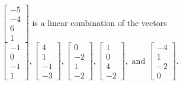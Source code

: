 \begin{exercise}
\begin{exerciseStatement}
  \end{exerciseStatement}
  \begin{exerciseAnswer}
   \(\left[\begin{array}{c}
-5 \\
-4 \\
6 \\
1
\end{array}\right]\) 
  	 is  
	a linear combination of the vectors \(\left[\begin{array}{c}
-1 \\
0 \\
-1 \\
1
\end{array}\right] , \left[\begin{array}{c}
4 \\
1 \\
-1 \\
-3
\end{array}\right] , \left[\begin{array}{c}
0 \\
-2 \\
1 \\
-2
\end{array}\right] , \left[\begin{array}{c}
1 \\
0 \\
4 \\
-2
\end{array}\right] , \text{ and } \left[\begin{array}{c}
-4 \\
1 \\
-2 \\
0
\end{array}\right]\).

	
  


  \end{exerciseAnswer}
\end{exercise}